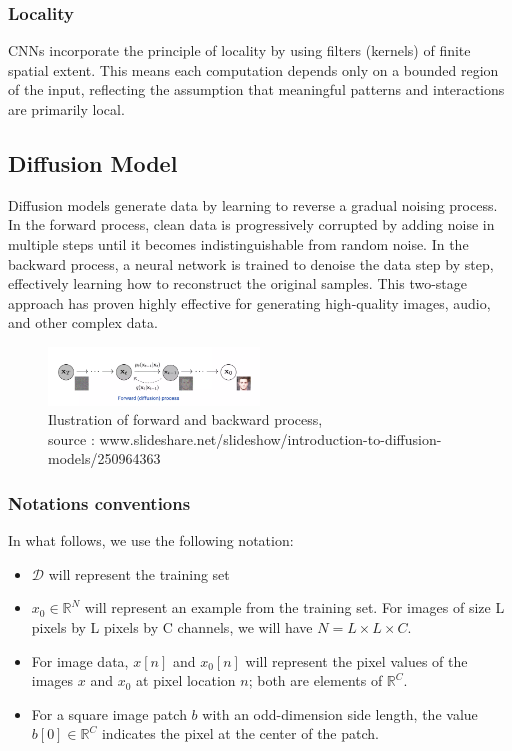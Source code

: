 \documentclass[a4paper,10pt]{article}
\theoremstyle{definition} %
\theoremstyle{definition} %
\theoremstyle{definition} %
\theoremstyle{definition} %
\newcommand{\R}{\mathbb{R}}
\newcommand{\0}{\boldsymbol{0}}
\newcommand{\D}{\mathcal{D}}
\begin{document}
\subsubsection{Locality}
CNNs incorporate the principle of locality by using filters (kernels) of finite spatial extent. This means each computation depends only on a bounded region of the input, reflecting the assumption that meaningful patterns and interactions are primarily local.
\subsection{Diffusion Model}
Diffusion models generate data by learning to reverse a gradual noising process. In the forward process, clean data is progressively corrupted by adding noise in multiple steps until it becomes indistinguishable from random noise. In the backward process, a neural network is trained to denoise the data step by step, effectively learning how to reconstruct the original samples. This two-stage approach has proven highly effective for generating high-quality images, audio, and other complex data.
\begin{figure}[h] %
    \centering
    \includegraphics[width=0.5\textwidth]{../images/Diffusion_model.png} %
    \caption{Ilustration of forward and backward process, \\source : www.slideshare.net/slideshow/introduction-to-diffusion-models/250964363}
    \label{fig:Diffusion_model}
\end{figure}

\subsubsection{Notations conventions}
In what follows, we use the following notation:
\begin{itemize}
    \item[] $\D$ will represent the training set
    \item[] $x_0\in\R^N$ will represent an example from the training set. For images of size L pixels by L pixels by C channels, we will have $N=L\times L \times C$.
    \item[] For image data, $x[n]$ and $x_0[n]$ will represent the pixel values of the images $x$ and $x_0$ at pixel location $n$; both are elements of $\R^C$.
    \item[] For a square image patch $b$ with an odd-dimension side length, the value $b[0] \in \R^C$ indicates the pixel at the center of the patch.
\end{itemize}
\end{document}
